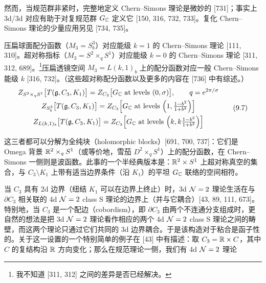 然而，当规范群非紧时，完整地定义 Chern--Simons 理论是微妙的 [731]；事实上 3d/3d 对应有助于对复规范群 $G_{\mathbb{C}}$ 定义它 [150, 316, 732, 733]。复化 Chern--Simons 理论的少量应用另见 [734, 735]。

压扁球面配分函数（$M_3=S^3_b$）对应能级 $k=1$ 的 Chern--Simons 理论 [111, 310]。超对称指标（$M_3=S^2\times_q S^1$）对应能级 $k=0$ 的 Chern--Simons 理论 [311, 312, 689]。\footnote{我不知道 [311, 312] 之间的差异是否已经解决。}压扁透镜空间 $M_3=L(k,1)_b$ 上的配分函数对应一般 Chern--Simons 能级 $k$ [316, 732]。（这些超对称配分函数以及更多的内容在 [736] 中有综述。）
\begin{equation}
\begin{gathered}
Z_{S^2\times_q S^1}\big[T(\fg,C_3,K_1)\big]=Z_{C_3}\big[G_{\C}\ \text{at levels}\ (0,\sigma)\big],\qquad q=\ee^{2\pi/\sigma}\\
Z_{S^3_b}\big[T(\fg,C_3,K_1)\big]=Z_{C_3}\Big[G_{\C}\ \text{at levels}\ \Big(1,\tfrac{1-b^2}{1+b^2}\Big)\Big]\\
Z_{L(k,1)_b}\big[T(\fg,C_3,K_1)\big]=Z_{C_3}\Big[G_{\C}\ \text{at levels}\ \Big(k,k\tfrac{1-b^2}{1+b^2}\Big)\Big]
\end{gathered}
\tag{9.7}
\end{equation}

这三者都可以分解为全纯块（holomorphic blocks）[691, 700, 737]：它们是 Omega 背景 $\mathbb{R}^2\times_q S^1$（或等价地，雪茄 $D^2\times_q S^1$）上的配分函数，在 Chern--Simons 一侧则是波函数。此事的一个半经典版本是：$\mathbb{R}^2\times S^1$ 上超对称真空的集合，与 $C_3\setminus K_1$ 上带有适当边界条件（沿 $K_1$）的平坦 $G_{\mathbb{C}}$ 联络的空间相符。

当 $C_3$ 具有 2d 边界（纽结 $K_1$ 可以在边界上终止）时，3d $\mathcal{N}=2$ 理论生活在与 $\partial C_3$ 相关联的 4d $\mathcal{N}=2$ class S 理论的边界上（并与它耦合）[43, 89, 111, 673]。特别地，当 $C_3$ 是一个配边（cobordism），即 $\partial C_3$ 由两个不连通分支组成时，更自然的想法是把 3d $\mathcal{N}=2$ 理论看作相应的两个 4d $\mathcal{N}=2$ class S 理论之间的畴壁，而这两个理论只通过它们共同的 3d 边界耦合。于是该构造对于粘合是函子性的。关于这一设置的一个特别简单的例子在 [43] 中有描述：取 $C_3=\mathbb{R}\times C$，其中 $C$ 的复结构沿 $\mathbb{R}$ 方向变化；那么在规范理论一侧，我们有 4d $\mathcal{N}=2$ 理论
